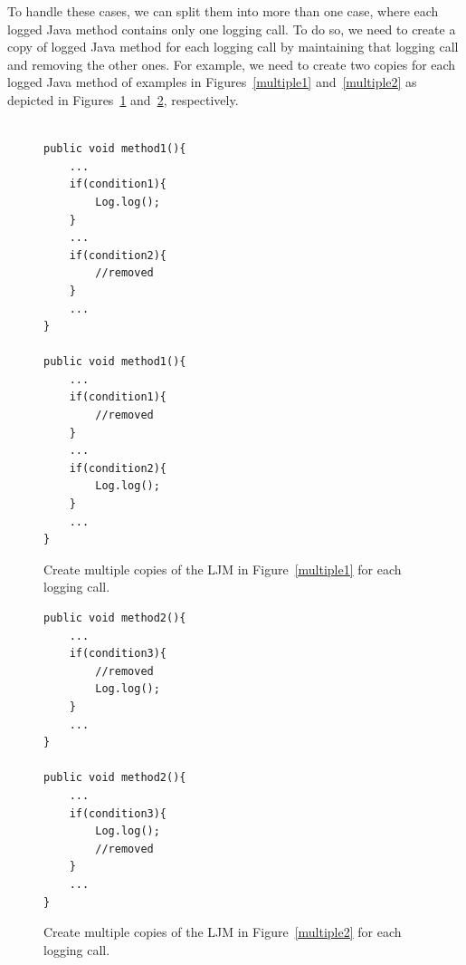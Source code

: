 To handle these cases, we can split them into more than one case, where each logged Java method contains only one logging call. To do so, we need to create a copy of logged Java method for each logging call by maintaining that logging call and removing the other ones. For example, we need to create two copies for each logged Java method of examples   in Figures~\ref{multiple1} and~\ref{multiple2} as depicted in Figures~\ref{multiple1-one} and~\ref{multiple2-one}, respectively.


\begin{figure}[H]
\def\baselinestretch{1}
\begin{lstlisting}

public void method1(){
	...
	if(condition1){
		Log.log();
	}
	...
	if(condition2){
		//removed
	}
	...
}

public void method1(){
	...
	if(condition1){
		//removed
	}
	...
	if(condition2){
		Log.log();
	}
	...
}

\end{lstlisting}
\caption{Create multiple copies of the LJM in Figure~\ref{multiple1} for each logging call.\label{multiple1-one}}
\end{figure}



\begin{figure}[H]
\def\baselinestretch{1}
\begin{lstlisting}
public void method2(){
	...
	if(condition3){
		//removed
		Log.log();
	}
	...
}

public void method2(){
	...
	if(condition3){
		Log.log();
		//removed
	}
	...
}

\end{lstlisting}
\caption{Create multiple copies of the LJM in Figure~\ref{multiple2} for each logging call.\label{multiple2-one}}
\end{figure}
